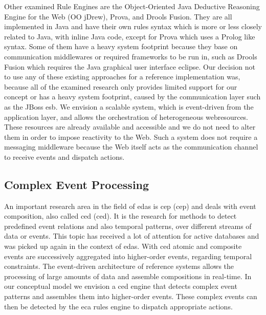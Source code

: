 Other examined Rule Engines are the \textrm{Object-Oriented Java Deductive Reasoning Engine for the Web} (\textrm{OO jDrew}), \textrm{Prova}, and \textrm{Drools Fusion}.
They are all implemented in \textrm{Java} and have their own rules syntax which is more or less closely related to \textrm{Java}, with inline \textrm{Java} code, except for \textrm{Prova} which uses a \textrm{Prolog} like syntax.
Some of them have a heavy system footprint because they base on communication middlewares or required frameworks to be run in, such as \textrm{Drools Fusion} which requires the Java graphical user interface \textrm{eclipse}. %
Our decision not to use any of these existing approaches for a reference implementation was, because all of the examined research only provides limited support for our concept or has a heavy system footprint, caused by the communication layer such as the \textrm{JBoss \acrshort{esb}}.
We envision a scalable system, which is event-driven from the application layer, and allows the orchestration of heterogeneous \textrm{\glspl{webresource}}.
These resources are already available and accessible and we do not need to alter them in order to impose reactivity to the Web.
Such a system does not require a messaging middleware because the Web itself acts as the communication channel to receive events and dispatch actions.


\subsection{Complex Event Processing}
An important research area in the field of \textrm{\acrlong{eda}s} is \textrm{\acrlong{cep} (\acrshort{cep})}\cite{anicic2010arlfcepar} and deals with event composition, also called \textrm{\acrlong{ced} (\acrshort{ced})}\cite{akdere2008plan}\cite{2004_1265833}.
It is the research for methods to detect predefined event relations and also temporal patterns, over different streams of data or events.
This topic has received a lot of attention for active databases\cite{Adaikkalavan2007}\cite{Gehani92compositeevent}\cite{Zimmer99onthe} and was picked up again in the context of \textrm{\acrlong{eda}s}.
With \textrm{\acrshort{ced}} atomic and composite events are successively aggregated into higher-order events, regarding temporal constraints.
The event-driven architecture of reference systems allows the processing of large amounts of data and assemble compositions in real-time.
In our conceptual model we envision a \textrm{\acrshort{ced}} engine that detects complex event patterns and assembles them into higher-order events.
These complex events can then be detected by the \textrm{\acrshort{eca}} rules engine to dispatch appropriate actions.
